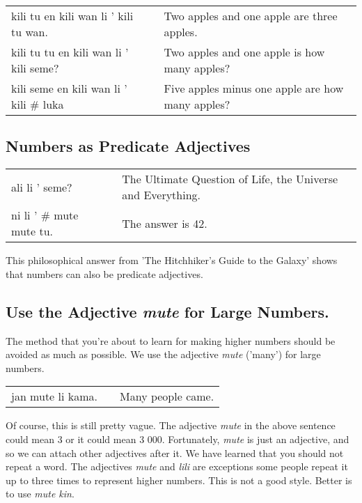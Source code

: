 \begin{supertabular}{p{5,5cm}|ll}
kili tu en kili wan li ' kili tu wan. && Two apples and one apple are three apples. \\
kili tu tu en kili wan li ' kili seme? && Two apples and one apple is how many apples?  \\
kili seme en kili wan li ' kili \# luka && Five apples minus one apple are how many apples? \\
\end{supertabular}

%
%
\subsection*{Numbers as Predicate Adjectives}
%

\begin{supertabular}{p{5,5cm}|ll}
ali li ' seme? &&  The Ultimate Question of Life, the Universe and Everything. \\
ni li ' \# mute mute tu.  && The answer is 42. \\
\end{supertabular} 

This philosophical answer from 'The Hitchhiker's Guide to the Galaxy' shows that numbers can also be predicate adjectives. 
%
%
\subsection*{Use the Adjective \textit{mute} for Large Numbers.}
%
%

The method that you're about to learn for making higher numbers should be avoided as much as possible. 
We use the adjective \textit{mute} ('many') for large numbers. 

\begin{supertabular}{p{5,5cm}|ll}
jan mute li kama. && Many people came. \\
\end{supertabular} 

Of course, this is still pretty vague. 
The adjective \textit{mute} in the above sentence could mean 3 or it could mean 3 000. 
Fortunately, \textit{mute} is just an adjective, and so we can attach other adjectives after it. 
We have learned that you should not repeat a word. 
The adjectives \textit{mute} and \textit{lili} are exceptions some people repeat it up to three times to represent higher numbers. 
This is not a good style. 
Better is to use \textit{mute kin}. 

